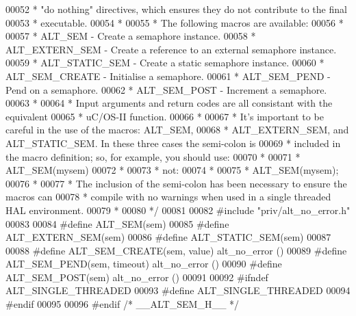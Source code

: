 \begin{DoxyCode}
00052 \textcolor{comment}{ * "do nothing" directives, which ensures they do not contribute to the final}
00053 \textcolor{comment}{ * executable.}
00054 \textcolor{comment}{ *}
00055 \textcolor{comment}{ * The following macros are available:}
00056 \textcolor{comment}{ *}
00057 \textcolor{comment}{ * ALT\_SEM        - Create a semaphore instance.}
00058 \textcolor{comment}{ * ALT\_EXTERN\_SEM - Create a reference to an external semaphore instance.}
00059 \textcolor{comment}{ * ALT\_STATIC\_SEM - Create a static semaphore instance.}
00060 \textcolor{comment}{ * ALT\_SEM\_CREATE - Initialise a semaphore.}
00061 \textcolor{comment}{ * ALT\_SEM\_PEND   - Pend on a semaphore.}
00062 \textcolor{comment}{ * ALT\_SEM\_POST   - Increment a semaphore.}
00063 \textcolor{comment}{ *}
00064 \textcolor{comment}{ * Input arguments and return codes are all consistant with the equivalent}
00065 \textcolor{comment}{ * uC/OS-II function.}
00066 \textcolor{comment}{ *}
00067 \textcolor{comment}{ * It's important to be careful in the use of the macros: ALT\_SEM, }
00068 \textcolor{comment}{ * ALT\_EXTERN\_SEM, and ALT\_STATIC\_SEM. In these three cases the semi-colon is}
00069 \textcolor{comment}{ * included in the macro definition; so, for example, you should use:}
00070 \textcolor{comment}{ *}
00071 \textcolor{comment}{ * ALT\_SEM(mysem)}
00072 \textcolor{comment}{ *}
00073 \textcolor{comment}{ * not:}
00074 \textcolor{comment}{ *}
00075 \textcolor{comment}{ * ALT\_SEM(mysem);}
00076 \textcolor{comment}{ *}
00077 \textcolor{comment}{ * The inclusion of the semi-colon has been necessary to ensure the macros can}
00078 \textcolor{comment}{ * compile with no warnings when used in a single threaded HAL environment.}
00079 \textcolor{comment}{ *}
00080 \textcolor{comment}{ */} 
00081 
00082 \textcolor{preprocessor}{#include "priv/alt_no_error.h"}
00083 
00084 \textcolor{preprocessor}{#define ALT\_SEM(sem)}
00085 \textcolor{preprocessor}{#define ALT\_EXTERN\_SEM(sem)}
00086 \textcolor{preprocessor}{#define ALT\_STATIC\_SEM(sem)}
00087               
00088 \textcolor{preprocessor}{#define ALT\_SEM\_CREATE(sem, value) alt\_no\_error () }
00089 \textcolor{preprocessor}{#define ALT\_SEM\_PEND(sem, timeout) alt\_no\_error ()}
00090 \textcolor{preprocessor}{#define ALT\_SEM\_POST(sem) alt\_no\_error ()}
00091 
00092 \textcolor{preprocessor}{#ifndef ALT\_SINGLE\_THREADED}
00093 \textcolor{preprocessor}{#define ALT\_SINGLE\_THREADED}
00094 \textcolor{preprocessor}{#endif}
00095 
00096 \textcolor{preprocessor}{#endif }\textcolor{comment}{/* \_\_ALT\_SEM\_H\_\_ */}\textcolor{preprocessor}{}
\end{DoxyCode}
